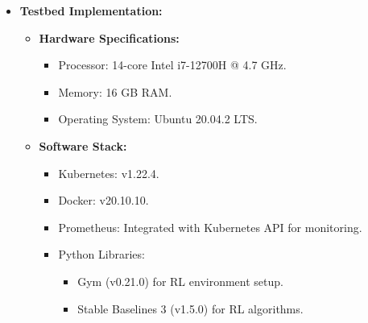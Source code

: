 \documentclass[conference]{IEEEtran}
\begin{document}
\begin{itemize}
    \item \textbf{Testbed Implementation:}
    \begin{itemize}
        \item \textbf{Hardware Specifications:}
        \begin{itemize}
            \item Processor: 14-core Intel i7-12700H @ 4.7 GHz.
            \item Memory: 16 GB RAM.
            \item Operating System: Ubuntu 20.04.2 LTS.
        \end{itemize}
        \item \textbf{Software Stack:}
        \begin{itemize}
            \item Kubernetes: v1.22.4.
            \item Docker: v20.10.10.
            \item Prometheus: Integrated with Kubernetes API for monitoring.
            \item Python Libraries:
            \begin{itemize}
                \item Gym (v0.21.0) for RL environment setup.
                \item Stable Baselines 3 (v1.5.0) for RL algorithms.
            \end{itemize}
        \end{itemize}
    \end{itemize}


\end{itemize}
\end{document}
